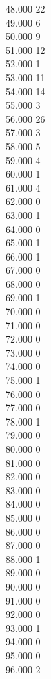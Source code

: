 { 48.000	22 \\
 49.000	6 \\
 50.000	9 \\
 51.000	12 \\
 52.000	1 \\
 53.000	11 \\
 54.000	14 \\
 55.000	3 \\
 56.000	26 \\
 57.000	3 \\
 58.000	5 \\
 59.000	4 \\
 60.000	1 \\
 61.000	4 \\
 62.000	0 \\
 63.000	1 \\
 64.000	0 \\
 65.000	1 \\
 66.000	1 \\
 67.000	0 \\
 68.000	0 \\
 69.000	1 \\
 70.000	0 \\
 71.000	0 \\
 72.000	0 \\
 73.000	0 \\
 74.000	0 \\
 75.000	1 \\
 76.000	0 \\
 77.000	0 \\
 78.000	1 \\
 79.000	0 \\
 80.000	0 \\
 81.000	0 \\
 82.000	0 \\
 83.000	0 \\
 84.000	0 \\
 85.000	0 \\
 86.000	0 \\
 87.000	0 \\
 88.000	1 \\
 89.000	0 \\
 90.000	0 \\
 91.000	0 \\
 92.000	0 \\
 93.000	1 \\
 94.000	0 \\
 95.000	0 \\
 96.000	2 \\
}
